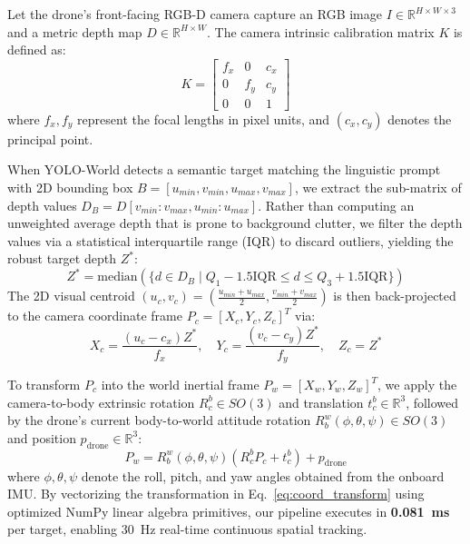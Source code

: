 \documentclass[conference]{IEEEtran}
\begin{document}
Let the drone's front-facing RGB-D camera capture an RGB image $I \in \mathbb{R}^{H \times W \times 3}$ and a metric depth map $D \in \mathbb{R}^{H \times W}$. The camera intrinsic calibration matrix $K$ is defined as:
\begin{equation}
    K = \begin{bmatrix}
        f_x & 0 & c_x \\
        0 & f_y & c_y \\
        0 & 0 & 1
    \end{bmatrix}
\end{equation}
where $f_x, f_y$ represent the focal lengths in pixel units, and $(c_x, c_y)$ denotes the principal point.

When YOLO-World detects a semantic target matching the linguistic prompt with 2D bounding box $B = [u_{min}, v_{min}, u_{max}, v_{max}]$, we extract the sub-matrix of depth values $D_B = D[v_{min}:v_{max}, u_{min}:u_{max}]$. Rather than computing an unweighted average depth that is prone to background clutter, we filter the depth values via a statistical interquartile range (IQR) to discard outliers, yielding the robust target depth $Z^*$:
\begin{equation}
    Z^* = \text{median}\left(\{ d \in D_B \mid Q_1 - 1.5\text{IQR} \le d \le Q_3 + 1.5\text{IQR} \}\right)
\end{equation}
The 2D visual centroid $(u_c, v_c) = \left(\frac{u_{min} + u_{max}}{2}, \frac{v_{min} + v_{max}}{2}\right)$ is then back-projected to the camera coordinate frame $P_c = [X_c, Y_c, Z_c]^T$ via:
\begin{equation}
    X_c = \frac{(u_c - c_x) Z^*}{f_x}, \quad Y_c = \frac{(v_c - c_y) Z^*}{f_y}, \quad Z_c = Z^*
\end{equation}

To transform $P_c$ into the world inertial frame $P_w = [X_w, Y_w, Z_w]^T$, we apply the camera-to-body extrinsic rotation $R_c^b \in SO(3)$ and translation $t_c^b \in \mathbb{R}^3$, followed by the drone's current body-to-world attitude rotation $R_b^w(\phi, \theta, \psi) \in SO(3)$ and position $p_{\text{drone}} \in \mathbb{R}^3$:
\begin{equation}
    P_w = R_b^w(\phi, \theta, \psi) \left( R_c^b P_c + t_c^b \right) + p_{\text{drone}}
    \label{eq:coord_transform}
\end{equation}
where $\phi, \theta, \psi$ denote the roll, pitch, and yaw angles obtained from the onboard IMU. By vectorizing the transformation in Eq.~\eqref{eq:coord_transform} using optimized NumPy linear algebra primitives, our pipeline executes in \textbf{0.081~ms} per target, enabling 30~Hz real-time continuous spatial tracking.
\end{document}

